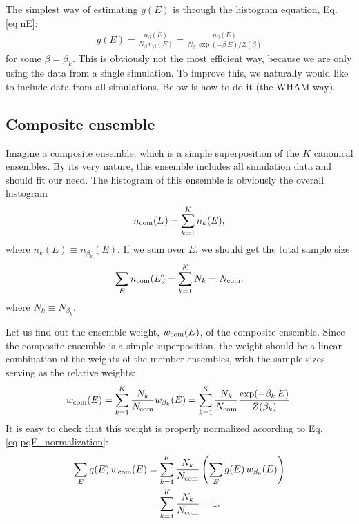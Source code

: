 \documentclass[aip,jcp,preprint,superscriptaddress]{revtex4-1}
\begin{document}
The simplest way
of estimating $g(E)$ is through the histogram equation,
Eq. \eqref{eq:nE}:
%
\begin{align}
\hat g(E)
=
\frac{ n_\beta(E) }
{ N_\beta \, w_\beta(E) }
=
\frac{ n_\beta(E) }
{ N_\beta \, \exp(-\beta \, E) / Z(\beta) }
\label{eq:gE_onehistogram}
\end{align}
for some $\beta = \beta_k$.
%
This is obviously not the most efficient way,
because we are only using the data
from a single simulation.
%
To improve this,
we naturally would like to include data
from all simulations.
%
Below is how to do it (the WHAM way).





\subsection{Composite ensemble}



Imagine a composite ensemble,
which is a simple superposition of
the $K$ canonical ensembles.
%
By its very nature,
this ensemble includes all simulation data
and should fit our need.
%
The histogram of this ensemble
is obviously the overall histogram
%
\begin{equation}
  n_{\mathrm{com}}(E)
=
  \sum_{k = 1}^K n_k(E),
  \label{eq:ncom_def}
\end{equation}
%
where $n_k(E) \equiv n_{\beta_k}(E)$.
%
If we sum over $E$,
we should get the total sample size
%
\begin{equation}
\sum_E n_{\mathrm{com}}(E)
=
\sum_{k = 1}^K N_k
=
N_{\mathrm{com}}.
\label{eq:ncom_sum}
\end{equation}
%
where $N_k \equiv N_{\beta_k}$.



Let us find out the ensemble weight, $w_{\mathrm{com}}(E)$,
of the composite ensemble.
%
Since the composite ensemble is a simple superposition,
the weight should be a linear combination
of the weights of the member ensembles,
with the sample sizes serving as the relative weights:
%
\begin{equation}
w_{\mathrm{com}}(E)
=
\sum_{k = 1}^K
\frac{ N_k } { N_{\mathrm{com}} }
w_{\beta_k}(E)
=
\sum_{k = 1}^K
\frac{ N_k } { N_{\mathrm{com}} }
\frac{ \exp( -\beta_k \, E ) } { Z(\beta_k) }.
\label{eq:wcom}
\end{equation}
%
It is easy to check that this weight is properly normalized
according to Eq. \eqref{eq:pqE_normalization}:
%
\begin{align*}
\sum_E g(E) \, w_{\mathrm{com}}(E)
&=
\sum_{k = 1}^K
\frac{ N_k } { N_{\mathrm{com}} }
\left(
  \sum_E g(E) \, w_{\beta_k}(E)
\right)
\\
&=
\sum_{k = 1}^K
\frac{ N_k } { N_{\mathrm{com}} }
=1.
\end{align*}
\end{document}

